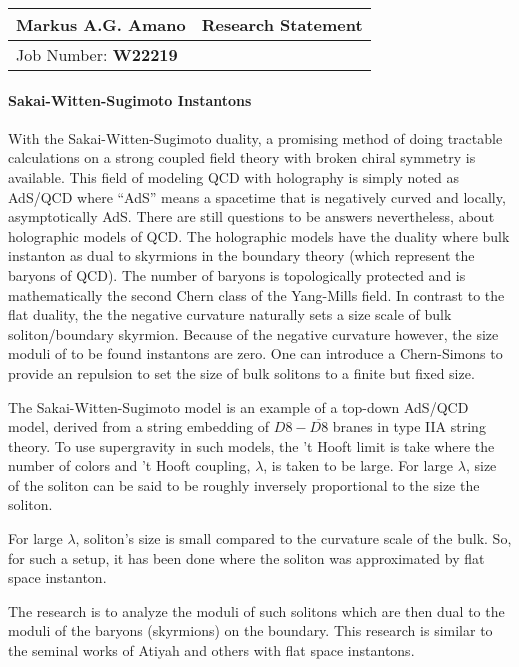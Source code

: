 \documentclass[12pt]{article}
\begin{document}
\begin{center}
  \begin{tabularx}{\textwidth} { 
      >{\raggedright\arraybackslash}X 
    >{\raggedleft\arraybackslash}X  }
    \huge Markus A.G. Amano & Research Statement\\
    \hline
    Job Number: \textbf{W22219} & \\
  \end{tabularx}
\end{center}

\paragraph{Sakai-Witten-Sugimoto Instantons}
With the Sakai-Witten-Sugimoto duality, a promising method of doing tractable calculations on a strong coupled field theory with broken chiral symmetry is available.
This field of modeling QCD with holography is simply noted as AdS/QCD where ``AdS'' means a spacetime that is negatively curved and locally, asymptotically AdS.
There are still questions to be answers nevertheless, about holographic models of QCD.
The holographic models have the duality where bulk instanton as dual to skyrmions in the boundary theory (which represent the baryons of QCD).
The number of baryons is topologically protected and is mathematically the second Chern class of the Yang-Mills field.
In contrast to the flat duality, the the negative curvature naturally sets a size scale of bulk soliton/boundary skyrmion.
Because of the negative curvature however, the size moduli of to be found instantons are zero.
One can introduce a Chern-Simons to provide an repulsion to set the size of bulk solitons to a finite but fixed size.

The Sakai-Witten-Sugimoto model is an example of a top-down AdS/QCD model, derived from a string embedding of $D8-\overline{D8}$ branes in type IIA string theory.
To use supergravity in such models, the 't Hooft limit is take where the number of colors and 't Hooft coupling, $\lambda$, is taken to be large.
For large $\lambda$, size of the soliton can be said to be roughly inversely proportional to the size the soliton.

For large $\lambda$, soliton's size is small compared to the curvature scale of the bulk. 
So, for such a setup, it has been done where the soliton was approximated by flat space instanton.

The research is to analyze the moduli of such solitons which are then dual to the moduli of the baryons (skyrmions) on the boundary.
This research is similar to the seminal works of Atiyah and others with flat space instantons.
\end{document}
